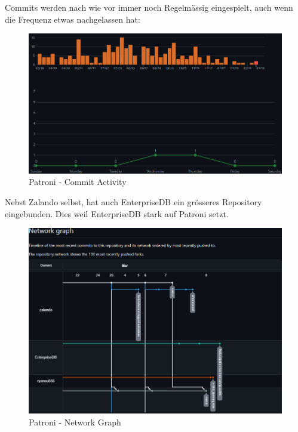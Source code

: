 \begin{flushleft}
    Commits werden nach wie vor immer noch Regelmässig eingespielt, auch wenn die Frequenz etwas nachgelassen hat:
    \begin{figure}[H]
        \centering
        \includegraphics[width=0.75\linewidth]{source/implementation/evaluation/postgresql_ha_solutions/insights/patroni/commit_activity_zalando_patroni}
        \caption{Patroni - Commit Activity}
        \label{fig:commit_activity_zalando_patroni}
    \end{figure}

    Nebst Zalando selbst, hat auch EnterpriseDB\cite{LNF967SI} ein grösseres Repository eingebunden.
    Dies weil EnterpriseDB stark auf Patroni setzt.
     \begin{figure}[H]
        \centering
        \includegraphics[width=0.75\linewidth]{source/implementation/evaluation/postgresql_ha_solutions/insights/patroni/networkgraph_zalando_patroni}
        \caption{Patroni - Network Graph}
        \label{fig:networkgraph_zalando_patroni}
    \end{figure}
\end{flushleft}